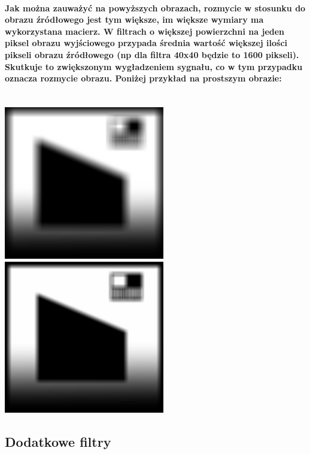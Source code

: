 \documentclass[a4paper,12pt,openany]{report}
\begin{document}
\pagebreak
\paragraph{\indent Jak można zauważyć na powyższych obrazach, rozmycie w stosunku do obrazu źródłowego jest tym większe, im większe wymiary ma wykorzystana macierz. W filtrach o większej powierzchni na jeden piksel obrazu wyjściowego przypada średnia wartość większej ilości pikseli obrazu źródłowego (np dla filtra 40x40 będzie to 1600 pikseli). Skutkuje to zwiększonym wygładzeniem sygnału, co w tym przypadku oznacza rozmycie obrazu. Poniżej przykład na prostszym obrazie:}

\begin{center}
\\
\includegraphics[width=7cm]{resources/modified/sample/sample_blur_40x40.jpg}
\includegraphics[width=7cm]{resources/modified/sample/sample_blur_20x20.jpg}
\end{center}

\pagebreak
\subsection{Dodatkowe filtry}
\end{document}
